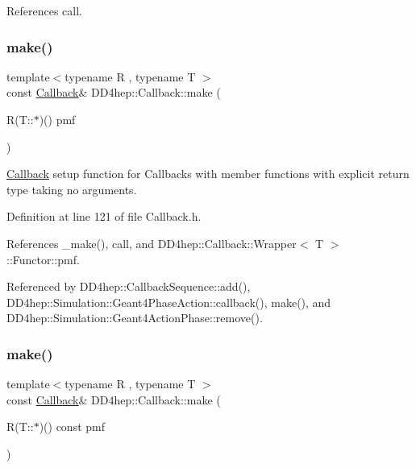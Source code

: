 References call.

\hypertarget{class_d_d4hep_1_1_callback_a3aa6b0364a554486845069dc02bfc4ef}{}\label{class_d_d4hep_1_1_callback_a3aa6b0364a554486845069dc02bfc4ef} 
\subsubsection{\texorpdfstring{make()}{make()}\hspace{0.1cm}{\footnotesize\ttfamily [1/17]}}
{\footnotesize\ttfamily template$<$typename R , typename T $>$ \\
const \hyperlink{class_d_d4hep_1_1_callback}{Callback}\& D\+D4hep\+::\+Callback\+::make (\begin{DoxyParamCaption}\item[{R(T\+::$\ast$)()}]{pmf }\end{DoxyParamCaption})\hspace{0.3cm}{\ttfamily [inline]}}



\hyperlink{class_d_d4hep_1_1_callback}{Callback} setup function for Callbacks with member functions with explicit return type taking no arguments. 



Definition at line 121 of file Callback.\+h.



References \+\_\+make(), call, and D\+D4hep\+::\+Callback\+::\+Wrapper$<$ T $>$\+::\+Functor\+::pmf.



Referenced by D\+D4hep\+::\+Callback\+Sequence\+::add(), D\+D4hep\+::\+Simulation\+::\+Geant4\+Phase\+Action\+::callback(), make(), and D\+D4hep\+::\+Simulation\+::\+Geant4\+Action\+Phase\+::remove().

\hypertarget{class_d_d4hep_1_1_callback_a5c1398bc61f92efeb4f88496f528f525}{}\label{class_d_d4hep_1_1_callback_a5c1398bc61f92efeb4f88496f528f525} 
\subsubsection{\texorpdfstring{make()}{make()}\hspace{0.1cm}{\footnotesize\ttfamily [2/17]}}
{\footnotesize\ttfamily template$<$typename R , typename T $>$ \\
const \hyperlink{class_d_d4hep_1_1_callback}{Callback}\& D\+D4hep\+::\+Callback\+::make (\begin{DoxyParamCaption}\item[{R(T\+::$\ast$)() const}]{pmf }\end{DoxyParamCaption})\hspace{0.3cm}{\ttfamily [inline]}}



